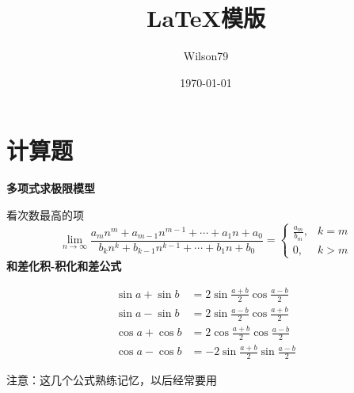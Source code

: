 \documentclass[12pt, a4paper]{ctexart}
\title{\LaTeX 模版}
\date{\today}
\author{Wilson79}
\begin{document}
    \maketitle{} %
    \tableofcontents %
    \thispagestyle{empty} %
    \newpage
    \setcounter{page}{1} %

   

\section{计算题}

    \begin{flushleft} %
    {\bfseries 多项式求极限模型}
    
    看次数最高的项
    \[
    \lim _{n \rightarrow \infty} \frac{a_{m} n^{m}+a_{m-1} n^{m-1}+\cdots+a_{1} n+a_{0}}{b_{k} n^{k}+b_{k-1} n^{k-1}+\cdots+b_{1} n+b_{0}}=\left\{\begin{array}{ll}{\frac{a_{m}}{b_{m}},} & {k=m} \\ {0,} & {k>m}\end{array}\right.
    \] %
    {\bfseries 和差化积-积化和差公式}

    \begin{align}
    \sin a + \sin b &= 2\sin \frac{a +b}{2} \cos \frac{a-b}{2} \\
    \sin a - \sin b &= 2\sin \frac{a - b}{2} \cos \frac{a + b}{2} \\
    \cos a + \cos b &= 2\cos \frac{a + b}{2} \cos \frac{a-b}{2} \\
    \cos a - \cos b &= -2\sin \frac{a+b}{2} \sin \frac{a-b}{2}
    \end{align}

    注意：这几个公式熟练记忆，以后经常要用
    
    \end{flushleft}
\end{document}
